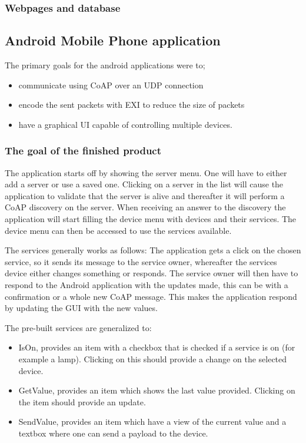 \subsubsection{Webpages and database}
\subsection{Android Mobile Phone application}

The primary goals for the android applications were to;
\begin{itemize}
 \item communicate using CoAP over an UDP connection
 \item encode the sent packets with EXI to reduce the size of packets
 \item have a graphical UI capable of controlling multiple devices.
\end{itemize}

\subsubsection{The goal of the finished product}

The application starts off by showing the server menu. One will have to either add a server or use a saved one. 
Clicking on a server in the list will cause the application to validate that the server is alive and thereafter it will perform a CoAP discovery on the server. 
When receiving an answer to the discovery the application will start filling the device menu with devices and their services. The device menu can then be accessed to use the services available.

The services generally works as follows: The application gets a click on the chosen service, so it sends its message to the service owner, whereafter the services device either changes something or responds.
The service owner will then have to respond to the Android application with the updates made, this can be with a confirmation or a whole new CoAP message. This makes the application respond by updating the GUI with the new values.\smallskip

The pre-built services are generalized to: 
\begin{itemize}
 \item IsOn, provides an item with a checkbox that is checked if a service is on (for example a lamp). Clicking on this should provide a change on the selected device.
 \item GetValue, provides an item which shows the last value provided. Clicking on the item should provide an update.
 \item SendValue, provides an item which have a view of the current value and a textbox where one can send a payload to the device.
\end{itemize}

